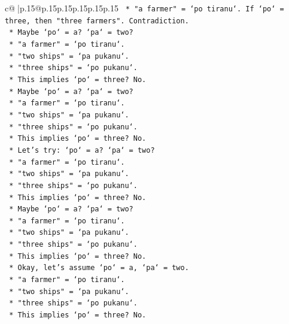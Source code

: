 \documentclass{article}
\begin{document}
{\begin{supertabular}{c@{$\;$}|p{.15\linewidth}@{}p{.15\linewidth}p{.15\linewidth}p{.15\linewidth}p{.15\linewidth}p{.15\linewidth}}
{{{\texttt{                *   "a farmer" = `po tiranu`. If `po` = three, then "three farmers". Contradiction.} \\
\texttt{                *   Maybe `po` = a? `pa` = two?} \\
\texttt{                *   "a farmer" = `po tiranu`.} \\
\texttt{                *   "two ships" = `pa pukanu`.} \\
\texttt{                *   "three ships" = `po pukanu`.} \\
\texttt{                *   This implies `po` = three? No.} \\
\texttt{                *   Maybe `po` = a? `pa` = two?} \\
\texttt{                *   "a farmer" = `po tiranu`.} \\
\texttt{                *   "two ships" = `pa pukanu`.} \\
\texttt{                *   "three ships" = `po pukanu`.} \\
\texttt{                *   This implies `po` = three? No.} \\
\texttt{                *   Let's try: `po` = a? `pa` = two?} \\
\texttt{                *   "a farmer" = `po tiranu`.} \\
\texttt{                *   "two ships" = `pa pukanu`.} \\
\texttt{                *   "three ships" = `po pukanu`.} \\
\texttt{                *   This implies `po` = three? No.} \\
\texttt{                *   Maybe `po` = a? `pa` = two?} \\
\texttt{                *   "a farmer" = `po tiranu`.} \\
\texttt{                *   "two ships" = `pa pukanu`.} \\
\texttt{                *   "three ships" = `po pukanu`.} \\
\texttt{                *   This implies `po` = three? No.} \\
\texttt{                *   Okay, let's assume `po` = a, `pa` = two.} \\
\texttt{                *   "a farmer" = `po tiranu`.} \\
\texttt{                *   "two ships" = `pa pukanu`.} \\
\texttt{                *   "three ships" = `po pukanu`.} \\
\texttt{                *   This implies `po` = three? No.} \\
}}}
\end{supertabular}}
\end{document}
